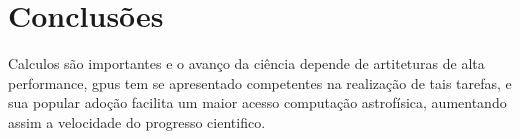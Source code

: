 \chapter{Conclusões}
\label{cap:conclusoes}

Calculos são importantes e o avanço da ciência depende de artiteturas de alta performance, gpus tem se apresentado competentes na realização de tais tarefas, e sua popular adoção facilita um maior acesso computação astrofísica, aumentando assim a velocidade do progresso cientifico.
